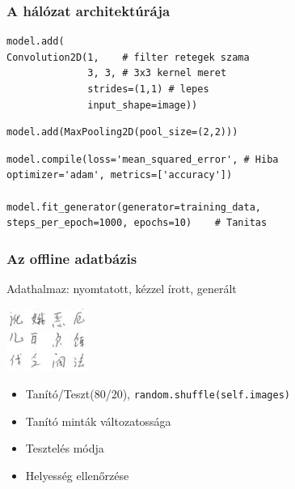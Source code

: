 \documentclass{beamer}
\begin{document}
\begin{frame}[fragile]
\frametitle{A hálózat architektúrája}

\begin{lstlisting}
model.add(
Convolution2D(1,	# filter retegek szama    
              3, 3,	# 3x3 kernel meret 
              strides=(1,1) # lepes
              input_shape=image))
\end{lstlisting}
\begin{lstlisting}
model.add(MaxPooling2D(pool_size=(2,2)))
\end{lstlisting}
\begin{lstlisting}
model.compile(loss='mean_squared_error', # Hiba
optimizer='adam', metrics=['accuracy'])

model.fit_generator(generator=training_data,
steps_per_epoch=1000, epochs=10)	# Tanitas
\end{lstlisting}

\end{frame}

\begin{frame}[fragile]
\frametitle{Az offline adatbázis}

Adathalmaz: nyomtatott, kézzel írott, generált

\medskip

\includegraphics[scale=1.5, center]{offline_dataset4x3}

\begin{itemize}
\item Tanító/Teszt(80/20), \texttt{random.shuffle(self.images)}
\item Tanító minták változatossága
\item Tesztelés módja
\item Helyesség ellenőrzése
\end{itemize}

\end{frame}
\end{document}
